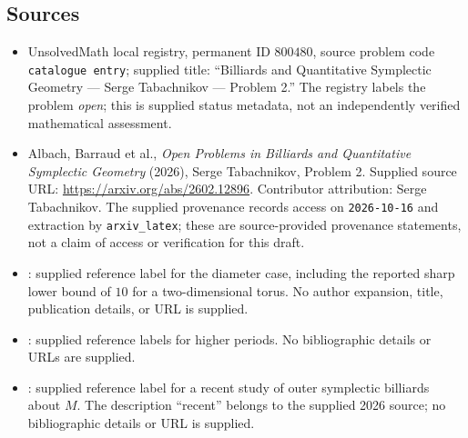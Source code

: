 \documentclass[11pt]{article}
\begin{document}
\subsection{Sources}
\begin{itemize}
\item UnsolvedMath local registry, permanent ID \(800480\), source problem code \texttt{catalogue entry}; supplied title: ``Billiards and Quantitative Symplectic Geometry --- Serge Tabachnikov --- Problem 2.'' The registry labels the problem \emph{open}; this is supplied status metadata, not an independently verified mathematical assessment.
\item Albach, Barraud et al., \emph{Open Problems in Billiards and Quantitative Symplectic Geometry} (2026), Serge Tabachnikov, Problem 2. Supplied source URL: \url{https://arxiv.org/abs/2602.12896}. Contributor attribution: Serge Tabachnikov. The supplied provenance records access on \texttt{2026-10-16} and extraction by \texttt{arxiv\_latex}; these are source-provided provenance statements, not a claim of access or verification for this draft.
\item [Pu]: supplied reference label for the diameter case, including the reported sharp lower bound of \(10\) for a two-dimensional torus. No author expansion, title, publication details, or URL is supplied.
\item [Du1, Du2]: supplied reference labels for higher periods. No bibliographic details or URLs are supplied.
\item [ACT]: supplied reference label for a recent study of outer symplectic billiards about \(M\). The description ``recent'' belongs to the supplied 2026 source; no bibliographic details or URL is supplied.
\end{itemize}
\end{document}

